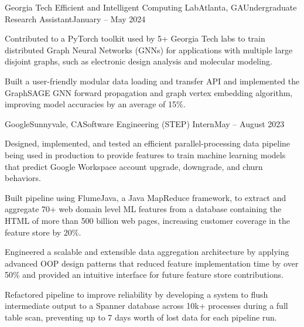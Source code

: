 \documentclass{article}
\begin{document}
\begin{flushleft}
    \begin{experience}{Georgia Tech Efficient and Intelligent Computing Lab}{Atlanta, GA}{Undergraduate Research Assistant}{January -- May 2024}
        \item Contributed to a PyTorch toolkit used by 5+ Georgia Tech labs to train distributed Graph Neural Networks (GNNs) for applications with multiple large disjoint graphs, such as electronic design analysis and molecular modeling.
        \item Built a user-friendly modular data loading and transfer API and implemented the GraphSAGE GNN forward propagation and graph vertex embedding algorithm, improving model accuracies by an average of 15\%.
    \end{experience}


    \begin{experience}{Google}{Sunnyvale, CA}{Software Engineering (STEP) Intern}{May -- August 2023}
        \item Designed, implemented, and tested an efficient parallel-processing data pipeline being used in production to provide features to train machine learning models that predict Google Workspace account upgrade, downgrade, and churn behaviors.
        \item Built pipeline using FlumeJava, a Java MapReduce framework, to extract and aggregate 70+ web domain level ML features from a database containing the HTML of more than 500 billion web pages, increasing customer coverage in the feature store by 20\%.
        \item Engineered a scalable and extensible data aggregation architecture by applying advanced OOP design patterns that reduced feature implementation time by over 50\% and provided an intuitive interface for future feature store contributions.
        \item Refactored pipeline to improve reliability by developing a system to flush intermediate output to a Spanner database across 10k+ processes during a full table scan, preventing up to 7 days worth of lost data for each pipeline run.
    \end{experience}


\end{flushleft}
\end{document}
